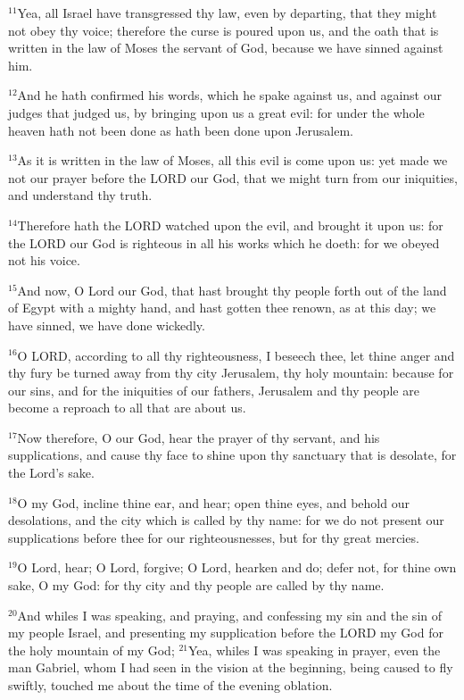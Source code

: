 \documentclass[12pt]{article}
\begin{document}
$^{11}$Yea, all Israel have transgressed thy law, even by departing,
that they might not obey thy voice; therefore the curse is poured upon
us, and the oath that is written in the law of Moses the servant of
God, because we have sinned against him.


$^{12}$And he hath confirmed his words, which he spake against us, and
against our judges that judged us, by bringing upon us a great evil:
for under the whole heaven hath not been done as hath been done upon
Jerusalem.


$^{13}$As it is written in the law of Moses, all this evil is come upon
us: yet made we not our prayer before the LORD our God, that we might
turn from our iniquities, and understand thy truth.


$^{14}$Therefore hath the LORD watched upon the evil, and brought it
upon us: for the LORD our God is righteous in all his works which he
doeth: for we obeyed not his voice.


$^{15}$And now, O Lord our God, that hast brought thy people forth out
of the land of Egypt with a mighty hand, and hast gotten thee renown,
as at this day; we have sinned, we have done wickedly.


$^{16}$O LORD, according to all thy righteousness, I beseech thee, let
thine anger and thy fury be turned away from thy city Jerusalem, thy
holy mountain: because for our sins, and for the iniquities of our
fathers, Jerusalem and thy people are become a reproach to all that
are about us.


$^{17}$Now therefore, O our God, hear the prayer of thy servant, and his
supplications, and cause thy face to shine upon thy sanctuary that is
desolate, for the Lord's sake.


$^{18}$O my God, incline thine ear, and hear; open thine eyes, and
behold our desolations, and the city which is called by thy name: for
we do not present our supplications before thee for our
righteousnesses, but for thy great mercies.


$^{19}$O Lord, hear; O Lord, forgive; O Lord, hearken and do; defer not,
for thine own sake, O my God: for thy city and thy people are called
by thy name.


$^{20}$And whiles I was speaking, and praying, and confessing my sin and
the sin of my people Israel, and presenting my supplication before the
LORD my God for the holy mountain of my God; $^{21}$Yea, whiles I was
speaking in prayer, even the man Gabriel, whom I had seen in the
vision at the beginning, being caused to fly swiftly, touched me about
the time of the evening oblation.
\end{document}
